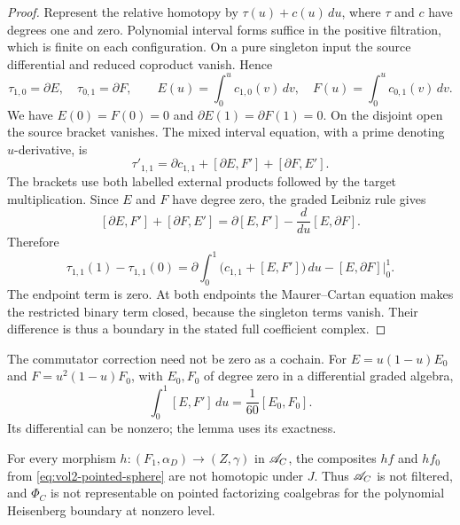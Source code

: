 \begin{proof}
Represent the relative homotopy by $\tau(u)+c(u)\,du$,
where $\tau$ and $c$ have degrees one and zero.
Polynomial interval forms suffice in the positive filtration,
which is finite on each configuration.
On a pure singleton input the source differential and reduced
coproduct vanish. Hence
\[
 \tau_{1,0}=\partial E,\quad \tau_{0,1}=\partial F,
 \qquad E(u)=\int_0^u c_{1,0}(v)\,dv,
 \quad F(u)=\int_0^u c_{0,1}(v)\,dv.
\]
We have $E(0)=F(0)=0$ and
$\partial E(1)=\partial F(1)=0$.
On the disjoint open the source bracket vanishes. The mixed
interval equation, with a prime denoting $u$-derivative, is
\[
 \tau'_{1,1}=\partial c_{1,1}
             +[\partial E,F']+[\partial F,E'].
\]
The brackets use both labelled external products followed by
the target multiplication. Since $E$ and $F$ have degree zero,
the graded Leibniz rule gives
\begin{equation}\label{eq:vol2-binary-boundary}
 [\partial E,F']+[\partial F,E']
       =\partial[E,F']-\frac{d}{du}[E,\partial F].
\end{equation}
Therefore
\[
 \tau_{1,1}(1)-\tau_{1,1}(0)
 =\partial\int_0^1\bigl(c_{1,1}+[E,F']\bigr)\,du
       -[E,\partial F]\big|_0^1.
\]
The endpoint term is zero. At both endpoints the
Maurer--Cartan equation makes the restricted binary term closed,
because the singleton terms vanish. Their difference is thus a
boundary in the stated full coefficient complex.
\end{proof}

The commutator correction need not be zero as a cochain.
For $E=u(1-u)E_0$ and $F=u^2(1-u)F_0$, with $E_0,F_0$
of degree zero in a differential graded algebra,
\[
 \int_0^1[E,F']\,du=\frac1{60}[E_0,F_0].
\]
Its differential can be nonzero; the lemma uses its exactness.

\begin{theorem}\label{thm:vol2-pointed-sphere}
For every morphism
$h:(F_1,\alpha_D)\to(Z,\gamma)$ in $\mathscr A_C$, the composites
$hf$ and $hf_0$ from \eqref{eq:vol2-pointed-sphere} are not
homotopic under $J$.
Thus $\mathscr A_C$ is not filtered, and $\Phi_C$ is not representable
on pointed factorizing coalgebras for the polynomial Heisenberg
boundary at nonzero level.
\end{theorem}

